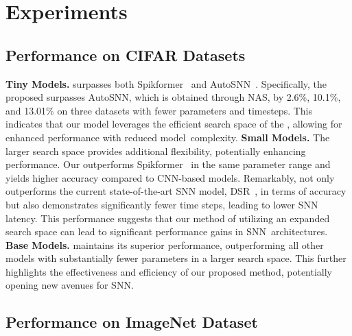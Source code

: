 \documentclass{article}
\theoremstyle{plain}
\theoremstyle{definition}
\theoremstyle{remark}
\begin{document}
\vskip -0.4in
\section{Experiments}
\subsection{Performance on CIFAR Datasets}

\textbf{Tiny Models.} \sysname surpasses both Spikformer~\cite{zhouSpikformerWhenSpiking2022} and AutoSNN~\cite{miaoNeuromorphicVisionDatasets2019}. Specifically, the proposed \sysname surpasses AutoSNN, which is obtained through NAS, by 2.6\%, 10.1\%, and 13.01\% on three datasets with fewer parameters and timesteps. This indicates that our model leverages the efficient search space of the \sysname, allowing for enhanced performance with reduced model~{complexity.} \textbf{Small Models.} The larger search space provides additional flexibility, potentially enhancing performance. Our \sysname outperforms Spikformer~\cite{zhouSpikformerWhenSpiking2022} in the same parameter range and yields higher accuracy compared to CNN-based models. Remarkably, \sysname not only outperforms the current state-of-the-art SNN model, DSR~\cite{mengTrainingHighPerformanceLowLatency2022}, in terms of accuracy but also demonstrates significantly fewer time steps, leading to lower SNN latency. This performance suggests that our \sysname method of utilizing an expanded search space can lead to significant performance gains in SNN~{architectures.} \textbf{Base Models.} \sysname maintains its superior performance, outperforming all other models with substantially fewer parameters in a larger search space. This further highlights the effectiveness and efficiency of our proposed method, potentially opening new avenues for SNN.

\subsection{Performance on ImageNet Dataset}
\end{document}
